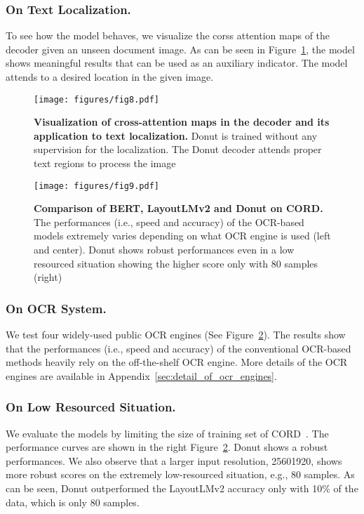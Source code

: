 \documentclass[runningheads]{llncs}
\newcommand\ours{{{\mbox{Donut}}}\xspace}
\begin{document}
\subsubsection{On Text Localization.}
To see how the model behaves, we visualize the corss attention maps of the decoder given an unseen document image. As can be seen in Figure~\ref{fig:detection}, the model shows meaningful results that can be used as an auxiliary indicator. The model attends to a desired location in the given image.

\begin{figure}[t]
    \centering
    \texttt{[image: figures/fig8.pdf]}
    \caption{{\bf Visualization of cross-attention maps in the decoder and its application to text localization.} \ours is trained without any supervision for the localization. The \ours decoder attends proper text regions to process the image}
    \label{fig:detection}
\end{figure}

\begin{figure}[!t]
    \centering
    \texttt{[image: figures/fig9.pdf]}
    \caption{\textbf{Comparison of BERT, LayoutLMv2 and \ours on CORD.} The performances (i.e., speed and accuracy) of the OCR-based models extremely varies depending on what OCR engine is used (left and center). \ours shows robust performances even in a low resourced situation showing the higher score only with 80 samples (right)}
    \label{fig:analysis_ablation_ocr_low_resource}
\end{figure}
\subsubsection{On OCR System.}
We test four widely-used public OCR engines (See Figure~\ref{fig:analysis_ablation_ocr_low_resource}). The results show that the performances (i.e., speed and accuracy) of the conventional OCR-based methods heavily rely on the off-the-shelf OCR engine.
More details of the OCR engines are available in Appendix~\ref{sec:detail_of_ocr_engines}. 

\subsubsection{On Low Resourced Situation.}
We evaluate the models by limiting the size of training set of CORD~\cite{park2019cord}. The performance curves are shown in the right Figure~\ref{fig:analysis_ablation_ocr_low_resource}. \ours shows a robust performances. We also observe that a larger input resolution, 25601920, shows more robust scores on the extremely low-resourced situation, e.g., 80 samples. As can be seen, \ours outperformed the LayoutLMv2 accuracy only with 10\% of the data, which is only 80 samples.  
\end{document}
